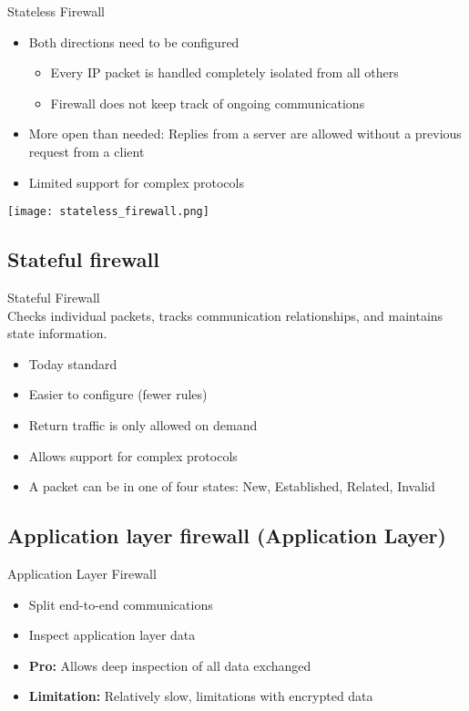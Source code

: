 \begin{concept}{Stateless Firewall}\\
    \begin{itemize}
        \item Both directions need to be configured
        \begin{itemize}
            \item Every IP packet is handled completely isolated from all others
            \item Firewall does not keep track of ongoing communications
        \end{itemize}
        \item More open than needed: Replies from a server are allowed without a previous request from a client
        \item Limited support for complex protocols
    \end{itemize}

    \texttt{[image: stateless\_firewall.png]}
\end{concept}

\subsection{Stateful firewall}

\begin{definition}{Stateful Firewall}\\
    Checks individual packets, tracks communication relationships, and maintains state information.
    \begin{itemize}
        \item Today standard
        \item Easier to configure (fewer rules)
        \item Return traffic is only allowed on demand
        \item Allows support for complex protocols
        \item A packet can be in one of four states: New, Established, Related, Invalid
    \end{itemize}
\end{definition}


\subsection{Application layer firewall (Application Layer)}

\begin{definition}{Application Layer Firewall}\\
    \begin{itemize}
        \item Split end-to-end communications
        \item Inspect application layer data
        \item \textbf{Pro:} Allows deep inspection of all data exchanged
        \item \textbf{Limitation:} Relatively slow, limitations with encrypted data
    \end{itemize}
\end{definition}

